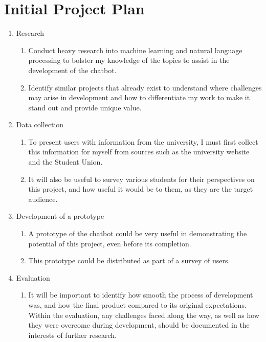 \documentclass[12pt]{report}
\begin{document}
    \section{Initial Project Plan}
    \begin{enumerate}
        \item Research
        \begin{enumerate}
            \item Conduct heavy research into machine learning and natural language processing to bolster my 
            knowledge of the topics to assist in the development of the chatbot.
            \item Identify similar projects that already exist to understand where challenges may arise in 
            development and how to differentiate my work to make it stand out and provide unique value.
        \end{enumerate}

        \item Data collection
        \begin{enumerate}
            \item To present users with information from the university, I must first collect this information
            for myself from sources such as the university website and the Student Union.
            \item It will also be useful to survey various students for their perspectives on this project, and 
            how useful it would be to them, as they are the target audience.
        \end{enumerate}

        \item Development of a prototype
        \begin{enumerate}
            \item A prototype of the chatbot could be very useful in demonstrating the potential of this project,
            even before its completion.
            \item This prototype could be distributed as part of a survey of users.
        \end{enumerate}

        \item Evaluation
        \begin{enumerate}
            \item It will be important to identify how smooth the process of development was, and how the final
            product compared to its original expectations. Within the evaluation, any challenges faced along the way,
            as well as how they were overcome during development, should be documented in the interests of further
            research.
        \end{enumerate}


\end{enumerate}
\end{document}
